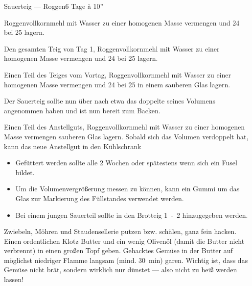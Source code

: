 \begin{MyRecipe}{Sauerteig --- Roggen}{}{6 Tage à 10''}
	
	
	Roggenvollkornmehl mit Wasser zu einer homogenen Masse vermengen und \si{24}{\hour} bei \si{25}{\degreeCelsius} lagern.
	
	
	Den gesamten Teig von Tag 1, Roggenvollkornmehl mit Wasser zu einer homogenen Masse vermengen und \si{24}{\hour} bei \si{25}{\degreeCelsius} lagern.
	
	
	Einen Teil des Teiges vom Vortag, Roggenvollkornmehl mit Wasser zu einer homogenen Masse vermengen und \si{24}{\hour} bei \si{25}{\degreeCelsius} in einem sauberen Glas lagern.
	
	Der Sauerteig sollte nun über nach etwa das doppelte seines Volumens angenommen haben und ist nun bereit zum Backen.
	

	Einen Teil des Anstellguts, Roggenvollkornmehl mit Wasser zu einer homogenen Masse vermengen sauberen Glas lagern. Sobald sich das Volumen verdoppelt hat, kann das neue Anstellgut in den Kühlschrank
	
	\begin{itemize}
		\item Gefüttert werden sollte alle 2 Wochen oder spätestens wenn sich ein Fusel bildet.
		\item Um die Volumenvergrößerung messen zu können, kann ein Gummi um das Glas zur Markierung des Füllstandes verwendet werden.
		\item Bei einem jungen Sauerteil sollte in den Brotteig \si{1-2}{\gram} hinzugegeben werden.
	\end{itemize}
	
	Zwiebeln, Möhren und Staudensellerie putzen bzw. schälen, ganz fein hacken. Einen ordentlichen Klotz Butter und ein wenig Olivenöl (damit die Butter nicht verbrennt) in einen großen Topf geben. Gehacktes Gemüse in der Butter auf möglichst niedriger Flamme langsam (mind. \SI{30}{\minute}) garen. Wichtig ist, dass das Gemüse nicht brät, sondern wirklich nur dünstet --- also nicht zu heiß werden lassen!\par\bigskip
	

\end{MyRecipe}
